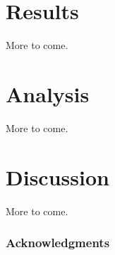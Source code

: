 \documentclass{article}
\begin{document}
\section{Results}

More to come.

\section{Analysis}

More to come.

\section{Discussion}

More to come.

\subsubsection*{Acknowledgments}


\end{document}
